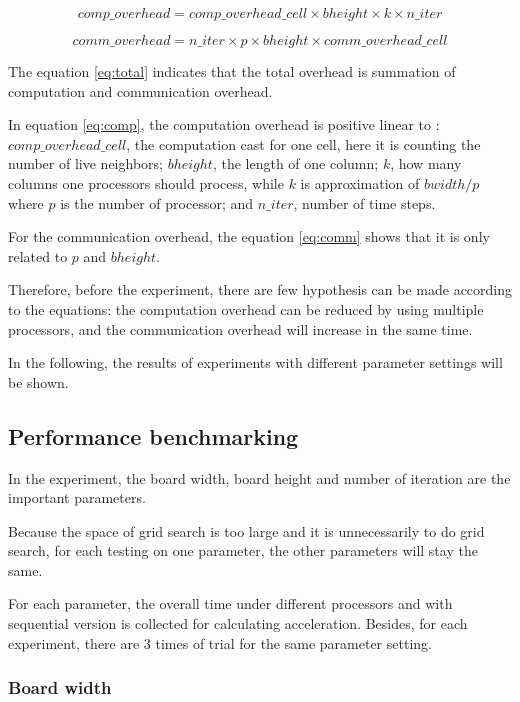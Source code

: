 \documentclass[sigchi]{acmart}
\begin{document}
\begin{equation}
  comp\_overhead=comp\_overhead\_cell\times bheight\times k\times n\_iter 
  \label{eq:comp}   
\end{equation}

\begin{equation}
  comm\_overhead=n\_iter\times p\times bheight\times comm\_overhead\_cell
  \label{eq:comm}
\end{equation}

The equation \ref{eq:total} indicates that the total overhead is summation of computation and communication overhead.

In equation \ref{eq:comp}, the computation overhead is positive linear to : $comp\_overhead\_cell$, the computation cast for one cell, here it is counting the number of live neighbors;
$bheight$, the length of one column; $k$, how many columns one processors should process, while $k$ is approximation of $bwidth/p$ where $p$ is the number of processor;
and $n\_iter$, number of time steps.

For the communication overhead, the equation \ref{eq:comm} shows that it is only related to $p$ and $bheight$.

Therefore, before the experiment, there are few hypothesis can be made according to the equations: 
the computation overhead can be reduced by using multiple processors, and the communication overhead will increase in the same time.

In the following, the results of experiments with different parameter settings will be shown.

\subsection{Performance benchmarking}

In the experiment, the board width, board height and number of iteration are the important parameters.

Because the space of grid search is too large and it is unnecessarily to do grid search, for each testing on one parameter, the other parameters will stay the same.

For each parameter, the overall time under different processors and with sequential version is collected for calculating acceleration.
Besides, for each experiment, there are 3 times of trial for the same parameter setting.

\subsubsection{Board width}
\end{document}
